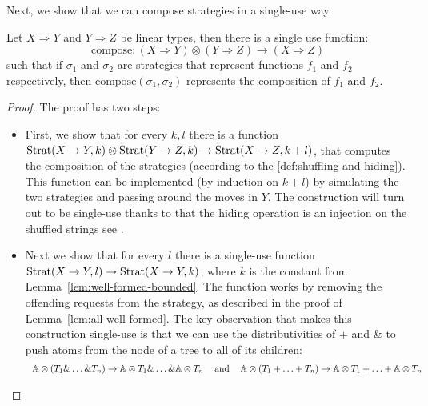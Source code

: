 Next, we show that we can compose strategies in a single-use way. 
\begin{lemma}\label{lem:compose-single-use-linear-type}
    Let $X \Rightarrow Y$ and $Y \Rightarrow Z$ be linear types, then there is a single use function:
    \[\text{compose} : (X \Rightarrow Y) \otimes (Y \Rightarrow Z) \to (X \Rightarrow Z)\]
    such that if $\sigma_1$ and $\sigma_2$ are strategies that represent functions $f_1$ and $f_2$ respectively,
    then $\text{compose}(\sigma_1, \sigma_2)$ represents the composition of $f_1$ and $f_2$.
\end{lemma}
\begin{proof}
    The proof has two steps:
    \begin{itemize}
        \item First, we show that for every $k, l$ there is a function
              $\text{Strat}(X \to Y, k) \otimes \text{Strat}(Y \to Z, k) \to \text{Strat}(X \to Z, k + l)$, 
              that computes the composition of the strategies (according to the \ref{def:shuffling-and-hiding}). 
              This function can be implemented (by induction on $k + l$) by simulating the two strategies 
              and passing around the moves in $Y$. The construction will turn out to be single-use 
              thanks to that the hiding operation is an injection on 
              the shuffled strings see \cite[Covering Lemma]{abramsky2013semantics}.
        \item Next we show that for every $l$ there is a single-use function 
              $\text{Strat}(X \to Y, l) \to \text{Strat}(X \to Y, k)$, where $k$ is the 
              constant from Lemma~\ref{lem:well-formed-bounded}.
              The function works by removing the offending requests from the 
              strategy, as described in the proof of Lemma~\ref{lem:all-well-formed}. The key observation that makes this construction single-use is that we can use the 
              distributivities of $+$ and $\&$ to push atoms from the node 
              of a tree to all of its children:
              \[
                \begin{tabular}{ccc}
                    $ \atoms \otimes (T_1 \& \ldots \& T_n) \to \atoms \otimes T_1 \& \ldots \& \atoms \otimes T_n$ & and &
                    $ \atoms \otimes (T_1 +  \ldots + T_n) \to \atoms \otimes T_1 + \ldots + \atoms \otimes T_n$
                \end{tabular}
              \]
    \end{itemize}
\end{proof}

